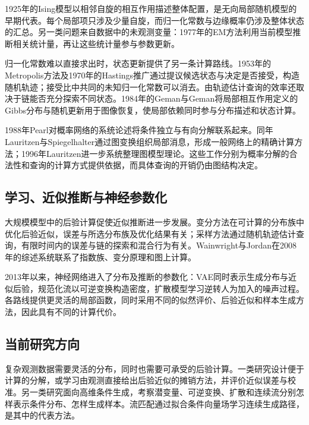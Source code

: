 1925年的Ising模型以相邻自旋的相互作用描述整体配置，是无向局部随机模型的早期代表。每个局部项只涉及少量自旋，而归一化常数与边缘概率仍涉及整体状态的汇总。另一类问题来自数据中的未观测变量：1977年的EM方法利用当前模型推断相关统计量，再让这些统计量参与参数更新。

归一化常数难以直接求出时，状态更新提供了另一条计算路线。1953年的Metropolis方法及1970年的Hastings推广通过提议候选状态与决定是否接受，构造随机轨迹；接受比中共同的未知归一化常数可以消去。由轨迹估计查询的效率还取决于链能否充分探索不同状态。1984年的Geman与Geman将局部相互作用定义的Gibbs分布与随机更新用于图像恢复，使局部依赖同时参与分布描述和状态计算。

1988年Pearl对概率网络的系统论述将条件独立与有向分解联系起来。同年Lauritzen与Spiegelhalter通过图变换组织局部消息，形成一般网络上的精确计算方法；1996年Lauritzen进一步系统整理图模型理论。这些工作分别为概率分解的合法性和查询的计算方式提供依据，而具体查询的开销仍由图结构决定。

\subsection{学习、近似推断与神经参数化}

大规模模型中的后验计算促使近似推断进一步发展。变分方法在可计算的分布族中优化后验近似，误差与所选分布族及优化结果有关；采样方法通过随机轨迹估计查询，有限时间内的误差与链的探索和混合行为有关。Wainwright与Jordan在2008年的综述系统联系了指数族、变分原理和图上计算。

2013年以来，神经网络进入了分布及推断的参数化：VAE同时表示生成分布与近似后验，规范化流以可逆变换构造密度，扩散模型学习逆转人为加入的噪声过程。各路线提供更灵活的局部函数，同时采用不同的似然评价、后验近似和样本生成方法，因此具有不同的计算代价。

\subsection{当前研究方向}

复杂观测数据需要灵活的分布，同时也需要可承受的后验计算。一类研究设计便于计算的分解，或学习由观测直接给出后验近似的摊销方法，并评价近似误差与校准。另一类研究面向高维条件生成，考察潜变量、可逆变换、扩散和连续流分别怎样表示条件分布、怎样生成样本。流匹配通过拟合条件向量场学习连续生成路径，是其中的代表方法。

